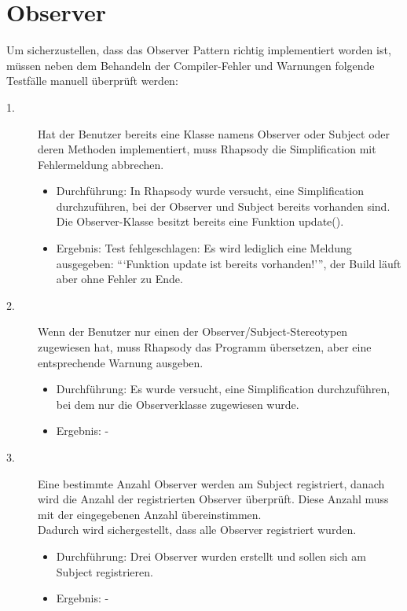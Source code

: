 \section{Observer}

Um sicherzustellen, dass das Observer Pattern richtig implementiert worden ist, müssen neben dem Behandeln der Compiler-Fehler und Warnungen folgende Testfälle manuell überprüft werden: 

\begin{description}

	\item[1.]
	Hat der Benutzer bereits eine Klasse namens Observer oder Subject oder deren Methoden implementiert, muss Rhapsody die Simplification mit Fehlermeldung abbrechen.
	\begin{itemize}
	  	\item{Durchführung:}
	  		In Rhapsody wurde versucht, eine Simplification durchzuführen, bei der
	  		Observer und Subject bereits vorhanden sind. Die Observer-Klasse besitzt
	  		bereits eine Funktion update().
	  	\item{Ergebnis:}
	  		Test fehlgeschlagen:
	  		Es wird lediglich eine Meldung ausgegeben: \enquote{`Funktion update ist
	  		bereits vorhanden!'}, der Build läuft aber ohne Fehler zu Ende.
	\end{itemize}
	
	\item[2.]
	Wenn der Benutzer nur einen der Observer/Subject-Stereotypen zugewiesen hat, muss Rhapsody das Programm übersetzen, aber eine entsprechende Warnung ausgeben.
	\begin{itemize}
  		\item{Durchführung:}
			Es wurde versucht, eine Simplification durchzuführen, bei dem nur die
			Observerklasse zugewiesen wurde.
  		\item{Ergebnis:}
			-
  	\end{itemize}
	
	\item[3.]
	Eine bestimmte Anzahl Observer werden am Subject registriert, danach wird die Anzahl der registrierten Observer überprüft. Diese Anzahl muss mit der eingegebenen Anzahl übereinstimmen. \\
	Dadurch wird sichergestellt, dass alle Observer registriert wurden.
	\begin{itemize}
  		\item{Durchführung:}
			Drei Observer wurden erstellt und sollen sich am Subject registrieren.
  		\item{Ergebnis:}
			-
  	\end{itemize}


\end{description}
